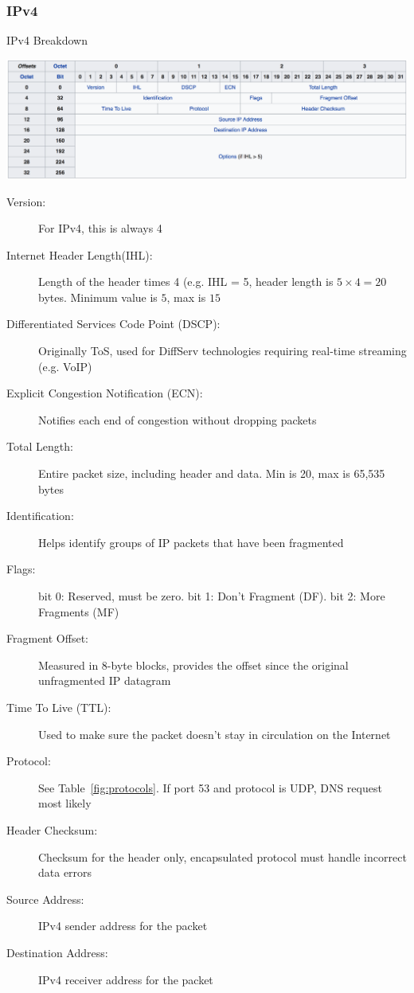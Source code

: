 \subsubsection{IPv4}
\begin{table}[H]
	\centering
	\caption{IPv4 Breakdown}
	\includegraphics[width=\linewidth]{ipv4}
\end{table}
\begin{description}
	\item[Version:] For IPv4, this is always 4
	\item[Internet Header Length(IHL):] Length of the header times 4 (e.g. IHL = 5, header length is $5\times4=20$ bytes. Minimum value is $5$, max is $15$
	\item[Differentiated Services Code Point (DSCP):] Originally ToS, used for DiffServ technologies requiring real-time streaming (e.g. VoIP)
	\item[Explicit Congestion Notification (ECN):] Notifies each end of congestion without dropping packets
	\item[Total Length:] Entire packet size, including header and data. Min is 20, max is 65,535 bytes
	\item[Identification:] Helps identify groups of IP packets that have been fragmented
	\item[Flags:] bit 0: Reserved, must be zero. bit 1: Don't Fragment (DF). bit 2: More Fragments (MF)
	\item[Fragment Offset:] Measured in 8-byte blocks, provides the offset since the original unfragmented IP datagram
	\item[Time To Live (TTL):] Used to make sure the packet doesn't stay in circulation on the Internet
	\item[Protocol:] See Table~\ref{fig:protocols}. If port 53 and protocol is UDP, DNS request most likely
	\item[Header Checksum:] Checksum for the header only, encapsulated protocol must handle incorrect data errors
	\item[Source Address:] IPv4 sender address for the packet
	\item[Destination Address:] IPv4 receiver address for the packet

\end{description}
